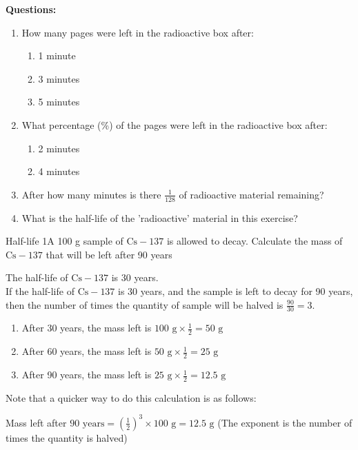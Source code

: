 {\textbf{Questions:}

\begin{enumerate}
\item{How many pages were left in the radioactive box after:
\begin{enumerate}
\item{1 minute}
\item{3 minutes}
\item{5 minutes}
\end{enumerate}
}
\item{What percentage (\%) of the pages were left in the radioactive box after:
\begin{enumerate}
\item{2 minutes}
\item{4 minutes}
\end{enumerate}
}
\item{After how many minutes is there $\frac{1}{128}$ of radioactive material remaining?}
\item{What is the half-life of the 'radioactive' material in this exercise?}
\end{enumerate}
}


\begin{wex}{Half-life 1}{A 100 g sample of $\text{Cs}-137$ is allowed to decay. Calculate the mass of $\text{Cs}-137$ that will be left after 90 years}{
The half-life of $\text{Cs}-137$ is 30 years.\\
If the half-life of $\text{Cs}-137$ is 30 years, and the sample is left to decay for 90 years, then the number of times the quantity of sample will be halved is $\frac{90}{30} = 3$.\\
\begin{enumerate}
 \item After 30 years, the mass left is $100 \text{ g} \times \frac{1}{2} = 50 \text{ g}$
\item After 60 years, the mass left is $50 \text{ g} \times \frac{1}{2} = 25 \text{ g}$
\item After 90 years, the mass left is $25 \text{ g} \times \frac{1}{2} = 12.5 \text{ g}$ 
\end{enumerate}

Note that a quicker way to do this calculation is as follows:

Mass left after $90 \text{ years} = (\frac{1}{2})^{3} \times 100 \text{ g} = 12.5 \text{ g}$ (The exponent is the number of times the quantity is halved)
}
\end{wex}

